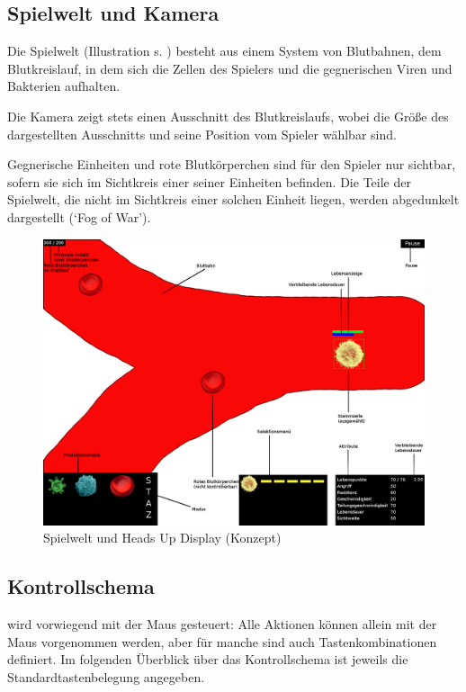 \subsection{Spielwelt und Kamera}

Die Spielwelt (Illustration s. ) besteht aus einem System von
Blutbahnen, dem Blutkreislauf, in dem sich die Zellen des Spielers und die
gegnerischen Viren und Bakterien aufhalten.

Die Kamera zeigt stets einen Ausschnitt des Blutkreislaufs, wobei die Größe
des dargestellten Ausschnitts und seine Position vom Spieler wählbar sind.

Gegnerische Einheiten und rote Blutkörperchen sind für den Spieler nur
sichtbar, sofern sie sich im Sichtkreis einer seiner Einheiten befinden. Die
Teile der Spielwelt, die nicht im Sichtkreis einer solchen Einheit liegen,
werden abgedunkelt dargestellt (\enquote*{Fog of War}).

\begin{figure}
  \includegraphics[width=\textwidth]{img_ui/hud}
  \caption{Spielwelt und Heads Up Display (Konzept)}
  \label{fig:hud}
\end{figure}

\subsection{Kontrollschema}

\name{} wird vorwiegend mit der Maus gesteuert: Alle Aktionen können allein mit
der Maus vorgenommen werden, aber für manche sind auch Tastenkombinationen
definiert. Im folgenden Überblick über das Kontrollschema ist jeweils die
Standardtastenbelegung angegeben.

